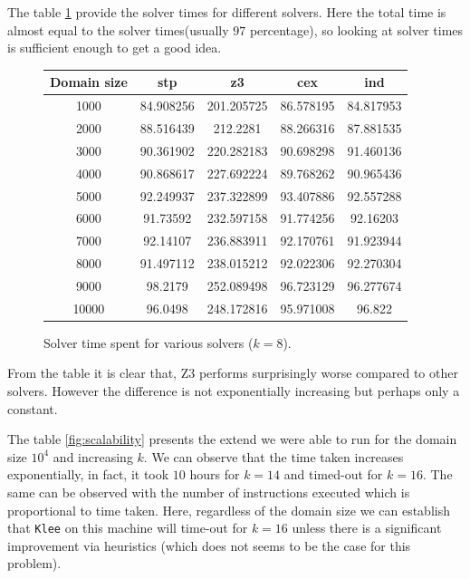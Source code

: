 \documentclass[11pt,a4paper,notitlepage]{article}
\begin{document}
The table \ref{fig:solvertime} provide the solver times for different solvers.
Here the total time is almost equal to the solver times(usually $97$ percentage),
so looking at solver times is sufficient enough to get a good idea.

\begin{figure}
\centering
\begin{tabular}{|c|c|c|c|c|}
\hline
\textbf{Domain size} & stp & z3 & cex & ind \\ \hline \hline
1000 & 84.908256 & 201.205725 & 86.578195 & 84.817953 \\
2000 & 88.516439 & 212.2281 & 88.266316 & 87.881535 \\
3000 & 90.361902 & 220.282183 & 90.698298 & 91.460136 \\
4000 & 90.868617 & 227.692224 & 89.768262 & 90.965436 \\
5000 & 92.249937 & 237.322899 & 93.407886 & 92.557288 \\
6000 & 91.73592 & 232.597158 & 91.774256 & 92.16203 \\
7000 & 92.14107 & 236.883911 & 92.170761 & 91.923944 \\
8000 & 91.497112 & 238.015212 & 92.022306 & 92.270304 \\
9000 & 98.2179 & 252.089498 & 96.723129 & 96.277674 \\
10000 & 96.0498 & 248.172816 & 95.971008 & 96.822 \\
\hline
\end{tabular}
\caption{Solver time spent for various solvers ($k = 8$).}
\label{fig:solvertime}
\end{figure}


From the table it is clear that, Z3 performs surprisingly worse compared to other solvers.
However the difference is not exponentially increasing but perhaps only a constant.

The table \ref{fig:scalability} presents the extend we were able to run for the domain size $10^4$ and increasing $k$.
We can observe that the time taken increases exponentially, in fact, it took $10$ hours for $k = 14$ and timed-out for $k=16$.
The same can be observed with the number of instructions executed which is proportional to time taken.
Here, regardless of the domain size we can establish that \texttt{Klee} on this machine will time-out for $k=16$ unless there is a significant improvement via heuristics (which does not seems to be the case for this problem).
\end{document}
